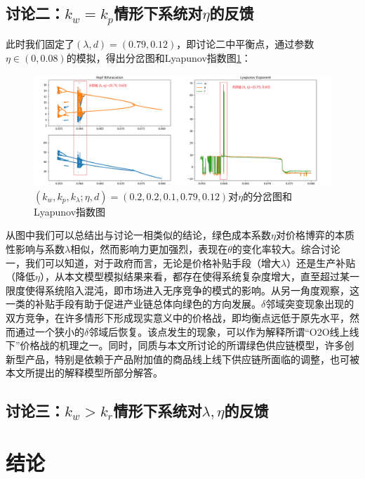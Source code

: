 \documentclass{article}
\begin{document}
\subsection{讨论二：$k_w=k_p$情形下系统对$\eta$的反馈}
\par 此时我们固定了$(\lambda,d)=(0.79,0.12)$，即讨论二中平衡点，通过参数$\eta\in(0,0.08)$的模拟，得出分岔图和Lyapunov指数图\ref{Hopf_Lyapunov_2_1}：
\begin{figure}[H]
    \centering
    \includegraphics[width=16.5cm]{Hopf_Lyapunov_2_1.png}
    \caption{$(k_w,k_p,k_\lambda;\eta,d)=(0.2,0.2,0.1,0.79,0.12)$对$\eta$的分岔图和Lyapunov指数图}
    \label{Hopf_Lyapunov_2_1}
\end{figure}
\par 从图中我们可以总结出与讨论一相类似的结论，绿色成本系数$\eta$对价格博弈的本质性影响与系数$\lambda$相似，然而影响力更加强烈，表现在$\theta$的变化率较大。综合讨论一，我们可以知道，对于政府而言，无论是价格补贴手段（增大$\lambda$）还是生产补贴（降低$\eta$），从本文模型模拟结果来看，都存在使得系统复杂度增大，直至超过某一限度使得系统陷入混沌，即市场进入无序竞争的模式的影响。从另一角度观察，这一类的补贴手段有助于促进产业链总体向绿色的方向发展。$\delta$邻域突变现象出现的双方竞争，在许多情形下形成现实意义中的价格战，即均衡点远低于原先水平，然而通过一个狭小的$\delta$邻域后恢复。该点发生的现象，可以作为解释所谓“O2O线上线下”价格战的机理之一。同时，同质与本文所讨论的所谓绿色供应链模型，许多创新型产品，特别是依赖于产品附加值的商品线上线下供应链所面临的调整，也可被本文所提出的解释模型所部分解答。
\subsection{讨论三：$k_w>k_r$情形下系统对$\lambda, \eta$的反馈}
\section{结论}
\par
\end{document}
